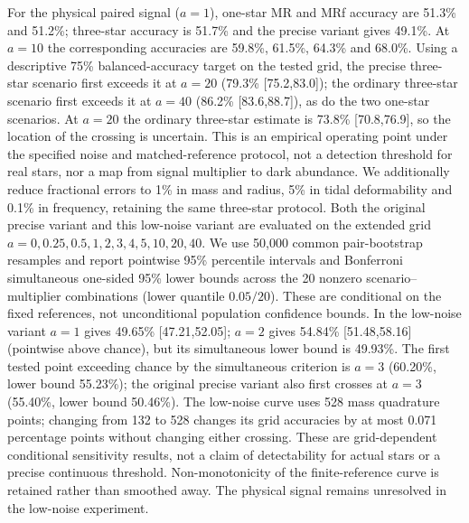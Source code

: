 \documentclass[11pt,a4paper]{article}
\begin{document}
For the physical paired signal ($a=1$), one-star MR and MRf accuracy are 51.3\% and 51.2\%; three-star accuracy is 51.7\% and the precise variant gives 49.1\%. At $a=10$ the corresponding accuracies are 59.8\%, 61.5\%, 64.3\% and 68.0\%. Using a descriptive 75\% balanced-accuracy target on the tested grid, the precise three-star scenario first exceeds it at $a=20$ (79.3\% [75.2,83.0]); the ordinary three-star scenario first exceeds it at $a=40$ (86.2\% [83.6,88.7]), as do the two one-star scenarios. At $a=20$ the ordinary three-star estimate is 73.8\% [70.8,76.9], so the location of the crossing is uncertain. This is an empirical operating point under the specified noise and matched-reference protocol, not a detection threshold for real stars, nor a map from signal multiplier to dark abundance.
We additionally reduce fractional errors to 1\% in mass and radius, 5\% in tidal deformability and 0.1\% in frequency, retaining the same three-star protocol. Both the original precise variant and this low-noise variant are evaluated on the extended grid $a=0,0.25,0.5,1,2,3,4,5,10,20,40$. We use 50,000 common pair-bootstrap resamples and report pointwise 95\% percentile intervals and Bonferroni simultaneous one-sided 95\% lower bounds across the 20 nonzero scenario--multiplier combinations (lower quantile $0.05/20$). These are conditional on the fixed references, not unconditional population confidence bounds. In the low-noise variant $a=1$ gives 49.65\% [47.21,52.05]; $a=2$ gives 54.84\% [51.48,58.16] (pointwise above chance), but its simultaneous lower bound is 49.93\%. The first tested point exceeding chance by the simultaneous criterion is $a=3$ (60.20\%, lower bound 55.23\%); the original precise variant also first crosses at $a=3$ (55.40\%, lower bound 50.46\%). The low-noise curve uses 528 mass quadrature points; changing from 132 to 528 changes its grid accuracies by at most 0.071 percentage points without changing either crossing. These are grid-dependent conditional sensitivity results, not a claim of detectability for actual stars or a precise continuous threshold. Non-monotonicity of the finite-reference curve is retained rather than smoothed away. The physical signal remains unresolved in the low-noise experiment.
\end{document}
